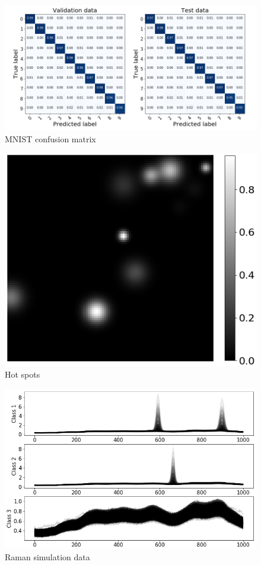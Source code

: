 \documentclass{article}
\begin{document}
\begin{figure}[H]
	\includegraphics[width=1\linewidth]{figures_3/Confusion_matrix_fine_tune.png}  
	\caption{MNIST confusion matrix}
\end{figure}

\begin{figure}[H]
    \centering
	\includegraphics[width=0.5\linewidth]{figures_3/raman_sim_hotspots.png}  
	\caption{Hot spots}
	\label{fig:hotspots}
\end{figure}


\begin{figure}[H]
	\centering
	\includegraphics[width=1\linewidth]{figures_3/raman_sim_training_data_2.png}  
	\caption{Raman simulation data}
	\label{fig:raman}
\end{figure}
\end{document}
